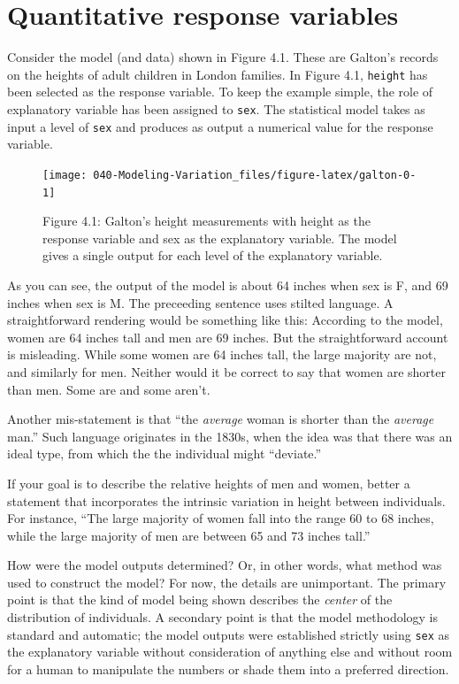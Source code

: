 \documentclass[]{tufte-book}
\begin{document}
\hypertarget{quantitative-response-variables}{%
\section{Quantitative response variables}\label{quantitative-response-variables}}

Consider the model (and data) shown in Figure 4.1. These are Galton's records on the heights of adult children in London families. In Figure 4.1, \texttt{height} has been selected as the response variable. To keep the example simple, the role of explanatory variable has been assigned to \texttt{sex}. The statistical model takes as input a level of \texttt{sex} and produces as output a numerical value for the response variable.

\begin{figure}\texttt{[image: 040-Modeling-Variation\_files/figure-latex/galton-0-1]} \caption[Figure 4.1]{Figure 4.1: Galton's height measurements with height as the response variable and sex as the explanatory variable. The model gives a single output for each level  of  the explanatory variable.}\label{fig:galton-0}
\end{figure}

As you can see, the output of the model is about 64 inches when sex is F, and 69 inches when sex is M. The preceeding sentence uses stilted language. A straightforward rendering would be something like this: According to the model, women are 64 inches tall and men are 69 inches. But the straightforward account is misleading. While some women are 64 inches tall, the large majority are not, and similarly for men. Neither would it be correct to say that women are shorter than men. Some are and some aren't.

Another mis-statement is that ``the \emph{average} woman is shorter than the \emph{average} man.'' Such language originates in the 1830s, when the idea was that there was an ideal type, from which the the individual might ``deviate.''

If your goal is to describe the relative heights of men and women, better a statement that incorporates the intrinsic variation in height between individuals. For instance, ``The large majority of women fall into the range 60 to 68 inches, while the large majority of men are between 65 and 73 inches tall.''

How were the model outputs determined? Or, in other words, what method was used to construct the model? For now, the details are unimportant. The primary point is that the kind of model being shown describes the \emph{center} of the distribution of individuals. A secondary point is that the model methodology is standard and automatic; the model outputs were established strictly using \texttt{sex} as the explanatory variable without consideration of anything else and without room for a human to manipulate the numbers or shade them into a preferred direction.
\end{document}
